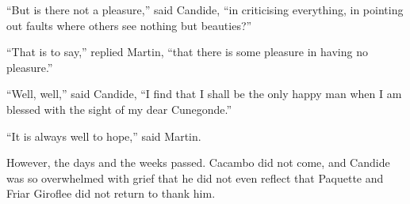 ``But is there not a pleasure,'' said Candide, ``in criticising everything, in pointing out faults where others see nothing but beauties?''

``That is to say,'' replied Martin, ``that there is some pleasure in having no pleasure.''

``Well, well,'' said Candide, ``I find that I shall be the only happy man when I am blessed with the sight of my dear Cunegonde.''

``It is always well to hope,'' said Martin.

However, the days and the weeks passed. Cacambo did not come, and Candide was so overwhelmed with grief that he did not even reflect that Paquette and Friar Giroflee did not return to thank him.

